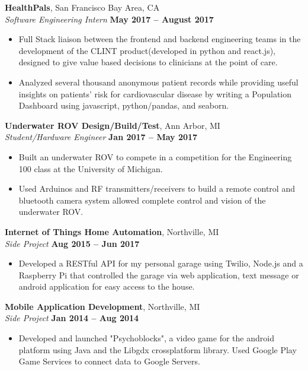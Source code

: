 \documentclass[margin,line]{resume}
\begin{document}
\begin{resume}
	\textbf{HealthPals}, San Francisco Bay Area, CA \vspace{2mm}\\\vspace{1mm}%
	\textsl{Software Engineering Intern} \hfill \textbf{May 2017 -- August 2017}
	\begin{itemize}
		\item Full Stack liaison between the frontend and backend engineering teams in the development of the CLINT product(developed in python and react.js), designed to give value based decisions to clinicians at the point of care.
		\item Analyzed several thousand anonymous patient records while providing useful insights on patients' risk for cardiovascular disease by writing a Population Dashboard using javascript, python/pandas, and seaborn.
	\end{itemize}




\textbf{Underwater ROV Design/Build/Test}, Ann Arbor, MI \vspace{2mm}\\\vspace{1mm}%
\textsl{Student/Hardware Engineer} \hfill \textbf{Jan 2017 -- May 2017}
\begin{itemize}
	\item Built an underwater ROV to compete in a competition for the Engineering 100 class at the University of Michigan.
	\item Used Arduinos and RF transmitters/receivers to build a remote control and bluetooth camera system allowed complete control and vision of the underwater ROV.
	
\end{itemize}

	\textbf{Internet of Things Home Automation}, Northville, MI \vspace{2mm}\\\vspace{1mm}%
	\textsl{Side Project} \hfill \textbf{Aug 2015 -- Jun 2017}
	\begin{itemize}
		\item Developed a RESTful API for my personal garage using Twilio, Node.js and a Raspberry Pi that controlled the garage via web application, text message or android application for easy access to the house.
	\end{itemize}
 
    \textbf{Mobile Application Development}, Northville, MI \vspace{2mm}\\\vspace{1mm}%
    \textsl{Side Project} \hfill \textbf{Jan 2014 -- Aug 2014}
    \begin{itemize}
    	\item 	Developed and launched "Psychoblocks", a video game for the android platform using Java and the Libgdx cross­platform library. Used Google Play Game Services to connect data to Google Servers.
    \end{itemize}
	

\end{resume}
\end{document}
